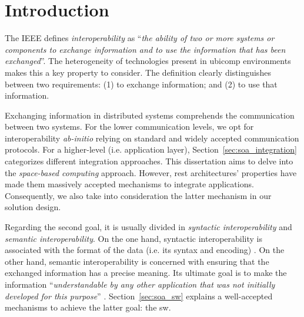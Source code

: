 \section{Introduction}
\label{sec:soa_intro}



The IEEE \citep{_ieee_1990} defines \emph{interoperability} as ``\emph{the ability of two or more systems or components to exchange information and to use the information that has been exchanged}''.
The heterogeneity of technologies present in \ac{ubicomp} environments makes this a key property to consider.
The definition clearly distinguishes between two requirements: %
(1) to exchange information; and
(2) to use that information. %


Exchanging information in distributed systems comprehends the communication between two systems.
For the lower communication levels, we opt for interoperability \emph{ab-initio} relying on standard and widely accepted communication protocols. %
For a higher-level (i.e. application layer), Section~\ref{sec:soa_integration} categorizes different integration approaches.
This dissertation aims to delve into the \emph{space-based computing} approach. %
However, \ac{rest} architectures' properties have made them massively accepted mechanisms to integrate applications.
Consequently, we also take into consideration the latter mechanism in our solution design.


Regarding the second goal, it is usually divided in \emph{syntactic interoperability} and \emph{semantic interoperability}.
On the one hand, syntactic interoperability is associated with the format of the data (i.e. its syntax and encoding) \citep{van_der_veer_achieving_2006}. %
On the other hand, semantic interoperability is concerned with ensuring that the exchanged information has a precise meaning.
Its ultimate goal is to make the information ``\emph{understandable by any other application that was not initially developed for this purpose}'' \citep{_european_2004}.
Section~\ref{sec:soa_sw} explains a well-accepted mechanisms to achieve the latter goal: the \acl{sw}. %




